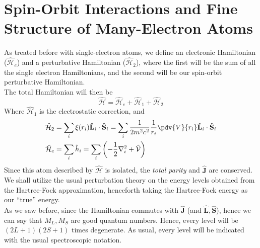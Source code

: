 \documentclass[a4paper, 11pt]{book}
\renewcommand{\vec}[1]{\mathbf{#1}}
\newcommand{\1}{\opr{\mathds{1}}}
\newcommand{\ham}{\mathcal{H}}
\newcommand{\opr}[1]{\hat{#1}}
\newcommand{\vecopr}[1]{\opr{\vec{#1}}}
\theoremstyle{plain}
\begin{document}
	\section{Spin-Orbit Interactions and Fine Structure of Many-Electron Atoms}
	As treated before with single-electron atoms, we define an electronic Hamiltonian ($\opr{\ham}_e$) and a perturbative Hamiltonian ($\opr{\ham}_2$), where the first will be the sum of all the single electron Hamiltonians, and the second will be our spin-orbit perturbative Hamiltonian.\\
	The total Hamiltonian will then be
	\begin{equation}
		\opr{\ham}=\opr{\ham}_e+\opr{\ham}_1+\opr{\ham}_2
		\label{eq:socouplingmanyelec}
	\end{equation}
	Where $\opr{\ham}_1$ is the electrostatic correction, and
	\begin{equation}
		\begin{aligned}
			\opr{\ham}_2&=\sum_i\xi(r_i)\vecopr{L}_i\cdot\vecopr{S}_i=\sum_i\frac{1}{2m^2c^2}\frac{1}{r_i}\pdv{V}{r_i}\vecopr{L}_i\cdot\vecopr{S}_i\\
			\opr{\ham}_e&=\sum_i\opr{h}_i=\sum_i\left( -\frac{1}{2}\nabla_i^2+\opr{\mathcal{V}} \right)
		\end{aligned}
		\label{eq:definitionssomultielec}
	\end{equation}
	Since this atom described by $\opr{\ham}$ is isolated, the \textit{total parity} and $\vecopr{J}$ are conserved.\\
	We shall utilize the usual perturbation theory on the energy levels obtained from the Hartree-Fock approximation, henceforth taking the Hartree-Fock energy as our ``true'' energy.\\
	As we saw before, since the Hamiltonian commutes with $\vecopr{J}$ (and $\vecopr{L},\vecopr{S}$), hence we can say that $M_L,M_S$ are good quantum numbers. Hence, every level will be $(2L+1)(2S+1)$ times degenerate. As usual, every level will be indicated with the usual spectroscopic notation.
\end{document}
